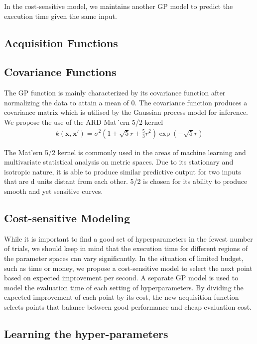 \documentclass[letterpaper]{article}
\begin{document}
In the cost-sensitive model, we maintains another GP model to predict the execution time given the same input.


\subsection{Acquisition Functions}

\subsection{Covariance Functions}
The GP function is mainly characterized by its covariance function after normalizing the data to attain a mean of 0. The covariance function produces a covariance matrix which is utilised by the Gaussian process model for inference.
We propose the use of the ARD Mat´ern 5/2 kernel
\begin{align*}
	k (\textbf{x},\textbf{x}') = \sigma^2(1+\sqrt5r+\frac{5}{3}r^2)\exp(-\sqrt5r)
\end{align*}

The Mat'ern 5/2 kernel is commonly used in the areas of machine learning and multivariate statistical analysis on metric spaces. Due to its stationary and isotropic nature, it is able to produce similar predictive output for two inputs that are d units distant from each other. 5/2 is chosen for its ability to produce smooth and yet sensitive curves.

\subsection{Cost-sensitive Modeling}
While it is important to find a good set of hyperparameters in the fewest number of trials, we should keep in mind that the execution time for different regions of the parameter spaces can vary significantly. In the situation of limited budget, such as time or money, we propose a cost-sensitive model to select the next point based on expected improvement per second. A separate GP model is used to model the evaluation time of each setting of hyperparameters. By dividing the expected improvement of each point by its cost, the new acquisition function selects points that balance between good performance and cheap evaluation cost.

\subsection{Learning the hyper-parameters}
\end{document}
